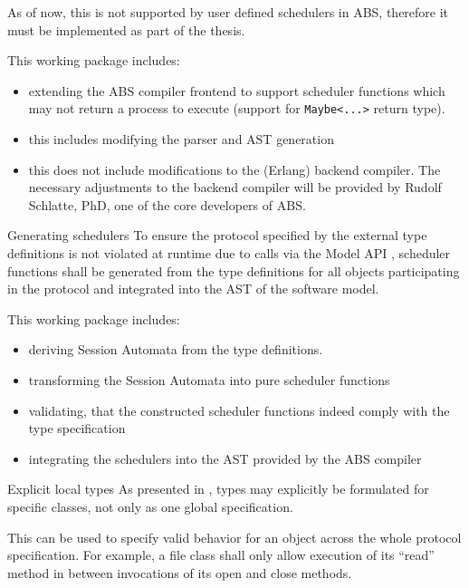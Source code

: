 \documentclass[paper=a4,nochapname,accentcolor=tud9c]{tudexercise}
\makeatletter
\def\namedlabel#1#2{\begingroup
    #1%
    \def\@currentlabel{\thedescriptcount}%
    \phantomsection\label{#2}\endgroup
}
\newcounter{descriptcount}
\renewcommand*\thedescriptcount{[\Alph{descriptcount}]}}
\renewcommand*\thedescriptcount{\roman{descriptcount}}}
\makeatother
\begin{document}
\begin{enumdescript}
    As of now, this is not supported by user defined schedulers in ABS,
    therefore it must be implemented as part of the thesis.

    This working package includes:
    \begin{itemize}
      \item extending the ABS compiler frontend to support scheduler functions which
        may not return a process to execute (support for \texttt{Maybe<...>}
        return type).
        \item this includes modifying the parser and AST generation
        \item this does not include modifications to the (Erlang) backend
          compiler. The necessary adjustments to the backend compiler will be
          provided by Rudolf Schlatte, PhD, one of the core developers of ABS.
    \end{itemize}
  \item[\namedlabel{Generating schedulers}{WPGenSchedulers}]%
    To ensure the protocol specified by the external type definitions is not
    violated at runtime due to calls via the Model API \cite{absmodelapi}, scheduler functions \cite{absschedulers}
    shall be generated from the type definitions for all objects participating
    in the protocol and integrated into the AST of the software model.

    This working package includes:
    \begin{itemize}
      \item deriving Session Automata \cite{kamburjan2016session} from the type definitions.
      \item transforming the Session Automata into pure scheduler functions \cite{absschedulers}
      \item validating, that the constructed scheduler functions indeed comply with the
        type specification
      \item integrating the schedulers into the AST provided by the ABS compiler
    \end{itemize}
  \item[\namedlabel{Explicit local types}{WPExplicitTypes}]%
    As presented in \cite{kamburjan2016session}, types may explicitly be
    formulated for specific classes, not only as one global specification.

    This can be used to specify valid behavior for an object across the whole
    protocol specification. For example, a file class shall only allow execution
    of its ``read'' method in between invocations of its open and close methods.


\end{enumdescript}
\end{document}
